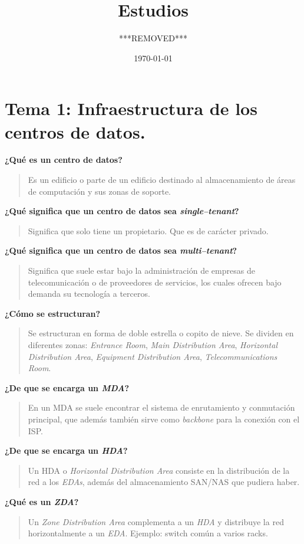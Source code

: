 \documentclass[11pt]{article}
\author{***REMOVED***}
\date{\today}
\title{Estudios}
\begin{document}
\maketitle
\tableofcontents


\section{Tema 1: Infraestructura de los centros de datos.}
\label{sec:orgfbf8d7d}
\textbf{¿Qué es un centro de datos?}
\begin{quote}
Es un edificio o parte de un edificio destinado al almacenamiento de áreas de computación y sus zonas de soporte.
\end{quote}

\textbf{¿Qué significa que un centro de datos sea \emph{single--tenant}?}
\begin{quote}
Significa que solo tiene un propietario. Que es de carácter privado.
\end{quote}

\textbf{¿Qué significa que un centro de datos sea \emph{multi--tenant}?}
\begin{quote}
Significa que suele estar bajo la administración de empresas de telecomunicación o de proveedores de servicios, los cuales ofrecen bajo demanda su tecnología a terceros.
\end{quote}

\textbf{¿Cómo se estructuran?}
\begin{quote}
Se estructuran en forma de doble estrella o copito de nieve. Se dividen en diferentes zonas: \emph{Entrance Room}, \emph{Main Distribution Area}, \emph{Horizontal Distribution Area}, \emph{Equipment Distribution Area}, \emph{Telecommunications Room}.
\end{quote}

\textbf{¿De que se encarga un \emph{MDA}?}
\begin{quote}
En un MDA se suele encontrar el sistema de enrutamiento y conmutación principal, que además también sirve como \emph{backbone} para la conexión con el ISP.
\end{quote}

\textbf{¿De que se encarga un \emph{HDA}?}
\begin{quote}
Un HDA o \emph{Horizontal Distribution Area} consiste en la distribución de la red a los \emph{EDAs}, además del almacenamiento SAN/NAS que pudiera haber.
\end{quote}

\textbf{¿Qué es un \emph{ZDA}?}
\begin{quote}
Un \emph{Zone Distribution Area} complementa a un \emph{HDA} y distribuye la red horizontalmente a un \emph{EDA}.
Ejemplo: switch común a varios racks.
\end{quote}
\end{document}
